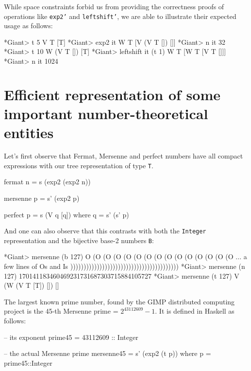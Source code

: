 \documentclass{TOOLS/llncs}
\begin{document}
While space constraints forbid us from providing the correctness
proofs of operations like {\tt exp2'} and {\tt leftshift'}, we are
able to illustrate their expected usage
as follows:
\begin{codex}
*Giant> t 5
V T [T]
*Giant> exp2 it
W T [V (V T []) []]
*Giant> n it
32
*Giant> t 10
W (V T []) [T]
*Giant> leftshift it (t 1)
W T [W T [V T []]]
*Giant> n it
1024

\end{codex}

\section{Efficient representation of some important number-theoretical entities} \label{theo}



Let's first observe that Fermat, Mersenne and perfect numbers have all compact
expressions with our tree representation of type {\tt T}.

\begin{code}
fermat n = s (exp2 (exp2 n))

mersenne p = s' (exp2 p)

perfect p = s (V q [q]) where q = s' (s' p)
\end{code}

And one can also observe that this contrasts with both the {\tt Integer} representation and
the bijective base-2 numbers {\tt B}:

\begin{codex}
*Giant> mersenne (b 127)
O (O (O (O (O (O (O (O (O (O (O (O (O (O (O 
  ... a few lines of Os and Is
  )))))))))))))))))))))))))))))))))))))))))
  *Giant> mersenne (n 127)
170141183460469231731687303715884105727
*Giant> mersenne (t 127)
V (W (V T [T]) []) []
\end{codex}


The largest known prime number, found by the GIMP distributed computing 
project \cite{wiki:gimp} is the 45-th Mersenne prime = $2^{43112609}-1$.
It is defined in Haskell as follows:
\begin{code}
-- its exponent
prime45 = 43112609 :: Integer

-- the actual Mersenne prime
mersenne45 = s' (exp2 (t p)) where 
  p = prime45::Integer

\end{code}
\end{document}
